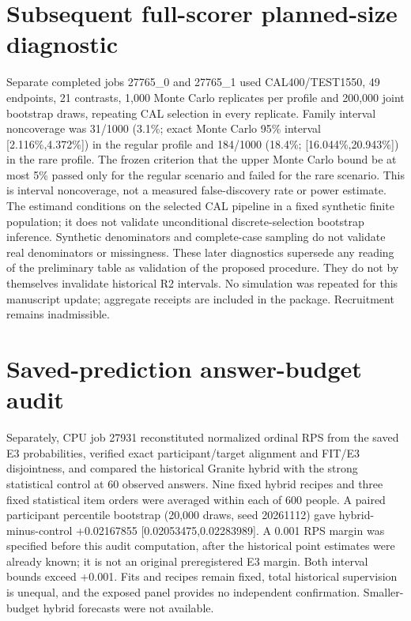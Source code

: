 \documentclass[10pt]{article}
\begin{document}
\section{Subsequent full-scorer planned-size diagnostic}
Separate completed jobs 27765\_0 and 27765\_1 used CAL400/TEST1550,
49 endpoints, 21 contrasts, 1,000 Monte Carlo replicates per profile and
200,000 joint bootstrap draws, repeating CAL selection in every replicate.
Family interval noncoverage was 31/1000 (3.1\%; exact Monte Carlo
95\% interval [2.116\%,4.372\%]) in the regular profile and 184/1000
(18.4\%; [16.044\%,20.943\%]) in the rare profile. The frozen criterion
that the upper Monte Carlo bound be at most 5\% passed only for the
regular scenario and failed for the rare scenario. This is interval
noncoverage, not a measured false-discovery rate or power estimate.
The estimand conditions on the selected CAL pipeline in a fixed synthetic
finite population; it does not validate unconditional discrete-selection
bootstrap inference. Synthetic denominators and complete-case sampling do
not validate real denominators or missingness. These later diagnostics
supersede any reading of the preliminary table as validation of the proposed
procedure. They do not by themselves invalidate historical R2 intervals.
No simulation was repeated for this manuscript update; aggregate receipts
are included in the package. Recruitment remains inadmissible.

\section{Saved-prediction answer-budget audit}
Separately, CPU job 27931 reconstituted normalized ordinal RPS from the saved
E3 probabilities, verified exact participant/target alignment and FIT/E3
disjointness, and compared the historical Granite hybrid with the strong
statistical control at 60 observed answers. Nine fixed hybrid recipes and
three fixed statistical item orders were averaged within each of 600 people.
A paired participant percentile bootstrap (20,000 draws, seed 20261112)
gave hybrid-minus-control +0.02167855 [0.02053475,0.02283989]. A 0.001 RPS
margin was specified before this audit computation, after the historical
point estimates were already known; it is not an original preregistered E3
margin. Both interval bounds exceed +0.001. Fits and recipes remain fixed,
total historical supervision is unequal, and the exposed panel provides no
independent confirmation. Smaller-budget hybrid forecasts were not available.
\end{document}
